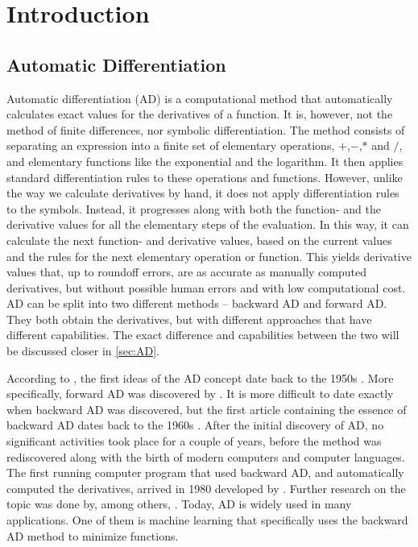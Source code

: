 \chapter{Introduction}
\section{Automatic Differentiation}
Automatic differentiation (AD) is a computational method that automatically calculates exact values for the derivatives of a function. It is, however, not the method of finite differences, nor symbolic differentiation. The method consists of separating an expression into a finite set of elementary operations, $+$,$-$,$*$ and $/$, and elementary functions like the exponential and the logarithm. It then applies standard differentiation rules to these operations and functions. However, unlike the way we calculate derivatives by hand, it does not apply differentiation rules to the symbols. Instead, it progresses along with both the function- and the derivative values for all the elementary steps of the evaluation. In this way, it can calculate the next function- and derivative values, based on the current values and the rules for the next elementary operation or function. This yields derivative values that, up to roundoff errors, are as accurate as manually computed derivatives, but without possible human errors and with low computational cost. AD can be split into two different methods -- backward AD and forward AD. They both obtain the derivatives, but with different approaches that have different capabilities. The exact difference and capabilities between the two will be discussed closer in \autoref{sec:AD}. 

According to \emph{\cite{SurveyAD}}, the first ideas of the AD concept date back to the 1950s \emph{\citep{nolan1953analytical, beda1959programs}}. More specifically, forward AD was discovered by \emph{\citet{wengert1964simple}}. It is more difficult to date exactly when backward AD was discovered, but the first article containing the essence of backward AD dates back to the 1960s \emph{\citep{boltyanskii1960theory}}. After the initial discovery of AD, no significant activities took place for a couple of years, before the method was rediscovered along with the birth of modern computers and computer languages. The first running computer program that used backward AD, and automatically computed the derivatives, arrived in 1980 developed by \emph{\citet{speelpenning1980compiling}}. Further research on the topic was done by, among others, \emph{\citet{griewank1989automatic}}. Today, AD is widely used in many applications. One of them is machine learning that specifically uses the backward AD method to minimize functions. 


